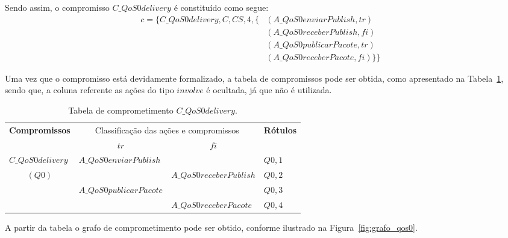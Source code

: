 Sendo assim, o compromisso $C\_QoS0delivery$ é constituído como segue:
\begin{eqnarray}
c = \{C\_QoS0delivery,C,CS,4, \{ &(A\_QoS0enviarPublish,tr)&  \nonumber \\
&(A\_QoS0receberPublish,fi)&  \nonumber \\
&(A\_QoS0publicarPacote,tr)&  \nonumber \\
&(A\_QoS0receberPacote,fi) \}\}& 
\end{eqnarray}

Uma vez que o compromisso está devidamente formalizado, a tabela de compromissos pode ser obtida, como apresentado na Tabela~\ref{tab:qos0}, sendo que, a coluna referente as ações do tipo $involve$ é ocultada, já que não é utilizada. 

\begin{table}[!ht]
	\centering\tiny{
		\caption{Tabela de comprometimento $C\_QoS0delivery$. \label{tab:qos0}}
\begin{tabular}{|l|l|l|l|}
	\hline
	\multicolumn{1}{|c|}{\multirow{2}{*}{\textbf{Compromissos}}} & \multicolumn{2}{c|}{Classificação das ações e compromissos} & \multicolumn{1}{c|}{\multirow{2}{*}{\textbf{Rótulos}}} \\ \cline{2-3}
	\multicolumn{1}{|c|}{}                                       & \multicolumn{1}{c|}{$tr$}    & \multicolumn{1}{c|}{$fi$}    & \multicolumn{1}{c|}{}                                  \\ \hline
	$C\_QoS0delivery$                                            & $A\_QoS0enviarPublish$       &                              & $Q0,1$                                                 \\ \cline{2-4} 
	\multicolumn{1}{|c|}{$(Q0)$}                                 &                              & $A\_QoS0receberPublish$      & $Q0,2$                                                 \\ \cline{2-4} 
	& $A\_QoS0publicarPacote$      &                              & $Q0,3$                                                 \\ \cline{2-4} 
	&                              & $A\_QoS0receberPacote$       & $Q0,4$                                                 \\ \hline
\end{tabular}
	}
\end{table}

A partir da tabela o grafo de comprometimento pode ser obtido, conforme ilustrado na Figura~\ref{fig:grafo_qos0}.

